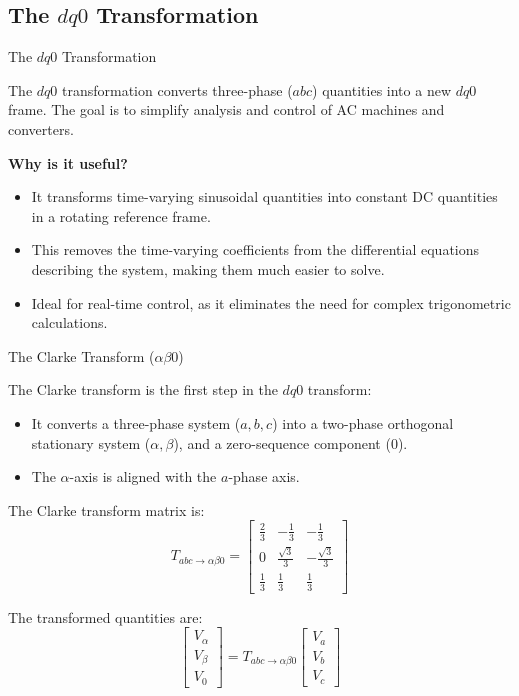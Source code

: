 \subsection{The $dq0$ Transformation}
\begin{frame}{The $dq0$ Transformation}

The $dq0$ transformation converts three-phase ($abc$) quantities into a new $dq0$ frame.
The goal is to simplify analysis and control of AC machines and converters.

\textbf{Why is it useful?}
\begin{itemize}
    \item It transforms time-varying sinusoidal quantities into constant DC quantities in a rotating reference frame.
    \item This removes the time-varying coefficients from the differential equations describing the system, making them much easier to solve.
    \item Ideal for real-time control, as it eliminates the need for complex trigonometric calculations.
\end{itemize}
\end{frame}

\begin{frame}[allowframebreaks]{The Clarke Transform ($\alpha\beta0$)}

The Clarke transform is the first step in the $dq0$ transform:
\begin{itemize}
    \item It converts a three-phase system ($a,b,c$) into a two-phase orthogonal stationary system ($\alpha, \beta$), and a zero-sequence component ($0$).
    \item The $\alpha$-axis is aligned with the $a$-phase axis.
\end{itemize}

The Clarke transform matrix is:
    $$
    T_{abc \to \alpha\beta0} = \begin{bmatrix}
    \frac{2}{3} & -\frac{1}{3} & -\frac{1}{3} \\
    0 & \frac{\sqrt{3}}{3} & -\frac{\sqrt{3}}{3} \\
    \frac{1}{3} & \frac{1}{3} & \frac{1}{3}
    \end{bmatrix}
    $$

The transformed quantities are:
    $$
    \begin{bmatrix}
    V_\alpha \\ V_\beta \\ V_0
    \end{bmatrix} = T_{abc \to \alpha\beta0} \begin{bmatrix}
    V_a \\ V_b \\ V_c
    \end{bmatrix}
    $$
\end{frame}

